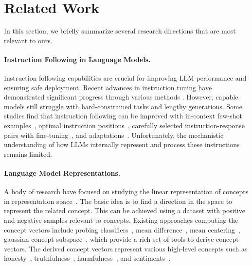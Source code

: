 \section{Related Work}
In this section, we briefly summarize several research directions that are most relevant to ours.

\paragraph{Instruction Following in Language Models.}
Instruction following capabilities are crucial for improving LLM performance and ensuring safe deployment. Recent advances in instruction tuning have demonstrated significant progress through various methods \cite{ouyang2022training,sanh2022multitask,wei2022finetuned,chung2024scaling}. However, capable models still struggle with hard-constrained tasks \cite{sun2023evaluating} and lengthy generations\cite{li2024measuring}. Some studies find that instruction following can be improved with in-context few-shot examples~\cite{kung2023models}, optimal instruction positions~\cite{liu2023instruction}, carefully selected instruction-response pairs with fine-tuning~\cite{zhou2024lima}, and adaptations~\cite{hewitt2024instruction}. Unfortunately, the mechanistic understanding of how LLMs internally represent and process these instructions remains limited. 

\paragraph{Language Model Representations.}
A body of research have focused on studying the linear representation of concepts in representation space~\cite{kim2018interpretability}. The basic idea is to find a direction in the space to represent the related concept. This can be achieved using a dataset with positive and negative samples relevant to concepts. Existing approaches computing the concept vectors include probing classifiers~\cite{belinkov2022probing}, mean difference~\cite{rimsky2024steering,zou2023representation}, mean centering~\cite{jorgensen2024improving}, gaussian concept subspace~\cite{zhao2025beyond}, which provide a rich set of tools to derive concept vectors. The derived concept vectors represent various high-level concepts such as honesty~\cite{li2024inference}, truthfulness~\cite{tigges2023linear}, harmfulness~\cite{zou2023representation}, and sentiments~\cite{zhao2025beyond}.

